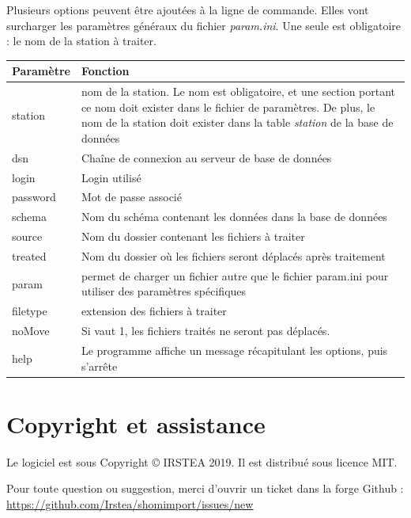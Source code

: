 \documentclass[12pt,a4paper]{article}
\begin{document}
Plusieurs options peuvent être ajoutées à la ligne de commande. Elles vont surcharger les paramètres généraux du fichier \textit{param.ini}. Une seule est obligatoire : le nom de la station à traiter.

\begin{tabular}{|l|>{\raggedright\arraybackslash}p{12cm}|}
\hline 
Paramètre & Fonction \\ 
\hline 
station & nom de la station. Le nom est obligatoire, et une section portant ce nom doit exister dans le fichier de paramètres. De plus, le nom de la station doit exister dans la table \textit{station} de la base de données \\
dsn & Chaîne de connexion au serveur de base de données\\
login & Login utilisé \\
password & Mot de passe associé \\
schema & Nom du schéma contenant les données dans la base de données \\
source & Nom du dossier contenant les fichiers à traiter \\
treated & Nom du dossier où les fichiers seront déplacés après traitement \\
param & permet de charger un fichier autre que le fichier param.ini pour utiliser des paramètres spécifiques \\
filetype & extension des fichiers à traiter \\
noMove & Si vaut 1, les fichiers traités ne seront pas déplacés. \\
help & Le programme affiche un message récapitulant les options, puis s'arrête \\
\hline
\end{tabular}


\section{Copyright et assistance}
Le logiciel est sous Copyright © IRSTEA 2019. Il est distribué sous licence MIT.

Pour toute question ou suggestion, merci d'ouvrir un ticket dans la forge Github : \href{https://github.com/Irstea/shomimport/issues/new}{https://github.com/Irstea/shomimport/issues/new}
\end{document}
